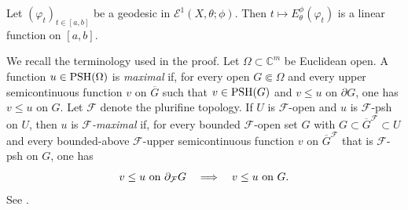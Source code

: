 \begin{proposition}\label{prop:energylinear}
    Let $(\varphi_t)_{t\in [a,b]}$ be a geodesic in $\mathcal{E}^1(X,\theta;\phi)$. Then $t\mapsto E_{\theta}^{\phi}(\varphi_t)$ is a linear function on $[a,b]$.
\end{proposition}
We recall the terminology used in the proof. Let $\Omega\subset\mathbb{C}^m$ be Euclidean open. A function $u\in\mathrm{PSH}(\Omega)$ is \emph{maximal} if, for every open $G\Subset\Omega$ and every upper semicontinuous function $v$ on $\overline G$ such that $v\in\mathrm{PSH}(G)$ and $v\leq u$ on $\partial G$, one has $v\leq u$ on $G$. Let $\mathcal F$ denote the plurifine topology. If $U$ is $\mathcal F$-open and $u$ is $\mathcal F$-psh on $U$, then $u$ is \emph{$\mathcal F$-maximal} if, for every bounded $\mathcal F$-open set $G$ with $G\subset\overline G^{\mathcal F}\subset U$ and every bounded-above $\mathcal F$-upper semicontinuous function $v$ on $\overline G^{\mathcal F}$ that is $\mathcal F$-psh on $G$, one has
\[
    v\leq u\textup{ on }\partial_{\mathcal F}G
    \quad\Longrightarrow\quad
    v\leq u\textup{ on }G.
\]
See \cite[Definition~5.9.1]{EKF}.
